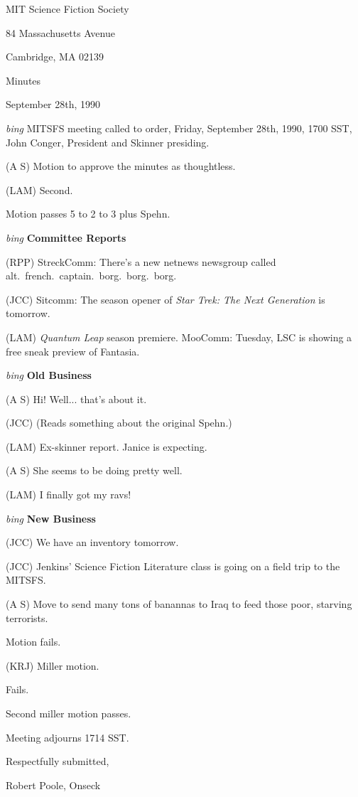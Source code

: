 \setlength{\topmargin}{-0.5in}
\setlength{\oddsidemargin}{0.0in}
\setlength{\evensidemargin}{0.0in}
\setlength{\textheight}{9in}
\setlength{\textwidth}{6.5in}



\begin{center}
MIT Science Fiction Society

84 Massachusetts Avenue

Cambridge, MA 02139

\vspace{0.2in}
Minutes

September 28th, 1990

\end{center}
 
\vspace{0.15in}
{\em bing\/}  MITSFS meeting called to order, Friday, September 28th, 1990,
1700 SST, John Conger, President and Skinner presiding.

(A S) Motion to approve the minutes as thoughtless.

(LAM) Second.

Motion passes 5 to 2 to 3 plus Spehn.

\vspace{0.15in}
{\em bing\/} {\bf Committee Reports\/}

(RPP) StreckComm: There's a new netnews newsgroup called\\
alt.~french.~captain.~borg.~borg.~borg.

(JCC) Sitcomm: The season opener of {\em Star Trek: The Next Generation\/} is
tomorrow.

(LAM) {\em Quantum Leap\/} season premiere.  MooComm: Tuesday, LSC is showing
a free sneak preview of Fantasia.

\vspace{.15in}
{\em bing\/} {\bf Old Business\/}

(A S) Hi!  Well... that's about it.

(JCC) (Reads something about the original Spehn.)

(LAM) Ex-skinner report.  Janice is expecting.

(A S) She seems to be doing pretty well.

(LAM) I finally got my ravs!

\vspace{0.15in}
{\em bing\/} {\bf New Business\/}

(JCC) We have an inventory tomorrow.

(JCC) Jenkins' Science Fiction Literature class is going on a field trip to
the MITSFS.

(A S) Move to send many tons of banannas to Iraq to feed those poor, starving
terrorists.

Motion fails.

(KRJ) Miller motion.

Fails.

Second miller motion passes.

Meeting adjourns 1714 SST.

\vspace{0.15in}
\begin{center}
Respectfully submitted,

Robert Poole, Onseck
\end{center}

